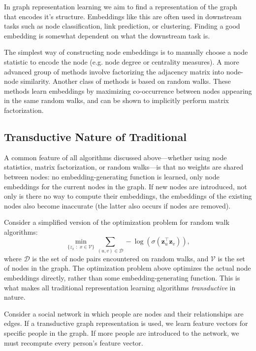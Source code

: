 In graph representation learning we aim to find a representation of the graph that encodes it's structure. Embeddings like this are often used in  downstream tasks such as node classification, link prediction, or clustering. Finding a good embedding is somewhat dependent on what the downstream task is.

The simplest way of constructing node embeddings is to manually choose a node statistic to encode the node (e.g. node degree or centrality measures). A more advanced group of methods involve factorizing the adjacency matrix into node-node similarity. Another class of methods is based on random walks. These methods learn embeddings by maximizing co-occurrence between nodes appearing in the same random walks, and can be shown to implicitly perform matrix factorization.



\subsection{Transductive Nature of Traditional }\label{sec:transductive}

A common feature of all  algorithms discussed above---whether using node
statistics, matrix factorization, or random walks---is that no weights are shared
between nodes: no embedding-generating function is learned, only node embeddings for
the current nodes in the graph. If new nodes are introduced, not only is there no way
to compute their embeddings, the embeddings of the existing nodes also become
inaccurate (the latter also occurs if nodes are removed).

Consider a simplified version of the optimization problem for random walk algorithms:
\[
\min_{\{z_x \,\,: \,\,x \in \mathcal{V} \}}
\sum_{(u,v)\in\mathcal{D}}
-\log\!\left(\sigma(\mathbf{z}_u^\top \mathbf{z}_v)\right),
\]
where $\mathcal{D}$ is the set of node pairs encountered on random walks, and
$\mathcal{V}$ is the set of nodes in the graph. The optimization problem above
optimizes the actual node embeddings directly, rather than some embedding-generating
function. This is what makes all traditional representation learning algorithms
\emph{transductive} in nature.

Consider a social network in which people are nodes and their relationships are edges.
If a transductive graph representation is used, we learn feature vectors for specific
people in the graph. If more people are introduced to the network, we must recompute
every person's feature vector.


